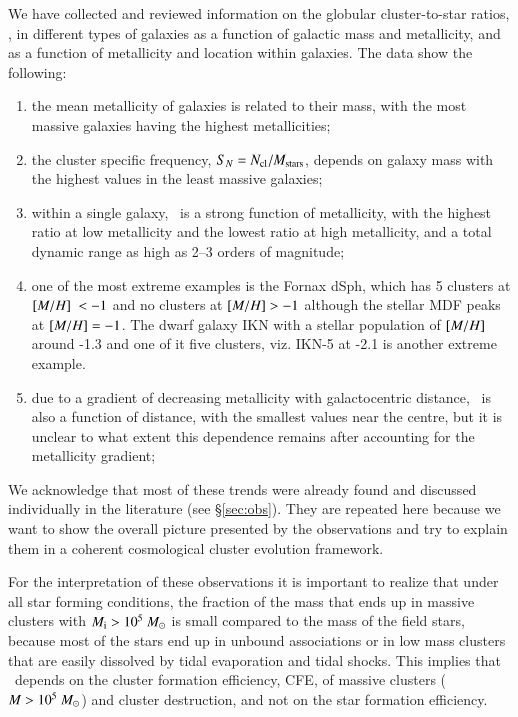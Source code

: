 \documentclass{aa}
\begin{document}
We have collected and reviewed information on the globular cluster-to-star ratios, \Rgcst, in different types of galaxies as a function of galactic mass and metallicity, and as a function of metallicity and location within galaxies. The data show the following:
\begin{enumerate}
\item the mean metallicity of galaxies is related to their mass, with the most massive galaxies having the highest metallicities; 
\item the cluster specific frequency, $S_N = N_{\rm cl}/M_{\rm stars}$, depends on galaxy mass with the highest values in the least massive galaxies; 
\item within a single galaxy, \Rgcst\ is a strong function of metallicity, with the highest ratio at low metallicity and the lowest ratio at high metallicity, and a total dynamic range as high as 2--3 orders of magnitude; 
\item one of the most extreme examples is the Fornax dSph, which has 5 clusters at $\mbox{$[M/H]$}\ <-1$ and no clusters at $\mbox{$[M/H]$} >-1$ although the stellar MDF peaks at $\mbox{$[M/H]$}=-1$. The dwarf galaxy IKN  with a stellar population of 
$\mbox{$[M/H]$}$ around -1.3 and one of it five clusters, viz. IKN-5 at -2.1 is another extreme example. 
\item due to a gradient of decreasing metallicity with galactocentric distance, \Rgcst\ is also a function of distance, with the smallest values near the centre, but it is unclear to what extent this dependence remains after accounting for the metallicity gradient; 
\end{enumerate}

We acknowledge that most of these trends were already found and discussed individually in the literature (see \S \ref{sec:obs}). They are repeated here because we want to show the overall picture presented by the observations and try to explain them in a coherent cosmological cluster evolution framework.

For the interpretation of these observations it is important to realize that under all star forming conditions, the fraction of the mass that ends up in massive clusters with $\mbox{$M_{\rm i}$} > 10^5~\mbox{$M_{\odot}$}$ is small compared to the mass of the field stars, because most of the stars end up in unbound associations or in low mass clusters that are easily dissolved by tidal evaporation and tidal shocks. This implies that \Rgcst\  depends on the cluster formation efficiency, CFE, of massive clusters ($M > 10^5~\mbox{$M_{\odot}$}$) and cluster destruction, and not on the star formation efficiency.
\end{document}
